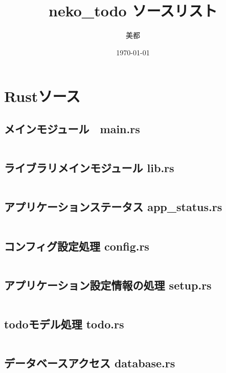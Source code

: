\documentclass[paper=a4paper, fontsize=10pt, head_space=10mm, foot_space=17mm, gutter=17mm, line_length=185mm, twoside]{jlreq}
\title{neko\_todo ソースリスト}
\author{美都}
\date{\today}
\begin{document}
\maketitle
\tableofcontents
\clearpage

\section{Rustソース}
\subsection{メインモジュール　main.rs}
\inputminted[linenos, breaklines]{rust}{src-rs/main.rs}
\clearpage

\subsection{ライブラリメインモジュール lib.rs}
\inputminted[linenos, breaklines]{rust}{src-rs/lib.rs}
\clearpage

\subsection{アプリケーションステータス app\_status.rs}
\inputminted[linenos, breaklines]{rust}{src-rs/app_status.rs}
\clearpage

\subsection{コンフィグ設定処理 config.rs}
\inputminted[linenos, breaklines]{rust}{src-rs/config.rs}
\clearpage

\subsection{アプリケーション設定情報の処理 setup.rs}
\inputminted[linenos, breaklines]{rust}{src-rs/setup.rs}
\clearpage

\subsection{todoモデル処理 todo.rs}
\inputminted[linenos, breaklines]{rust}{src-rs/todo.rs}
\clearpage

\subsection{データベースアクセス database.rs}
\inputminted[linenos, breaklines]{rust}{src-rs/database.rs}
\clearpage
\end{document}
